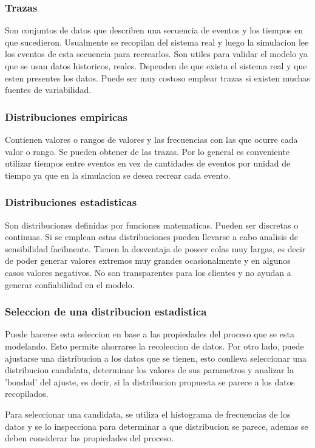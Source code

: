 \documentclass[a4paper]{article}
\begin{document}
\subsubsection*{Trazas}
Son conjuntos de datos que describen una secuencia de eventos y los tiempos en que 
sucedieron. Usualmente se recopilan del sistema real y luego la simulacion lee 
los eventos de esta secuencia para recrearlos. Son utiles para validar el modelo 
ya que se usan datos historicos, reales.
Dependen de que exista el sistema real y que esten presentes los datos. Puede ser muy
costoso emplear trazas si existen muchas fuentes de variabilidad.

\subsubsection*{Distribuciones empiricas}
Contienen valores o rangos de valores y las frecuencias con las que ocurre cada valor o rango.
Se pueden obtener de las trazas.
Por lo general es conveniente utilizar tiempos entre eventos en vez de cantidades de eventos por
unidad de tiempo ya que en la simulacion se desea recrear cada evento.

\subsubsection*{Distribuciones estadisticas}
Son distribuciones definidas por funciones matematicas. Pueden ser discretas o continuas.
Si se emplean estas distribuciones pueden llevarse a cabo analisis de sensibilidad 
facilmente. Tienen la desventaja de poseer colas muy largas, es decir de poder generar
valores extremos muy grandes ocasionalmente y en algunos casos valores negativos.
No son transparentes para los clientes y no ayudan a generar confiabilidad en el modelo.

\subsubsection*{Seleccion de una distribucion estadistica}
Puede hacerse esta seleccion en base a las propiedades del proceso que se esta modelando.
Esto permite ahorrarse la recoleccion de datos.
Por otro lado, puede ajustarse una distribucion a los datos que se tienen, esto conlleva 
seleccionar una distribucion candidata, determinar los valores de sus parametros y analizar
la 'bondad' del ajuste, es decir, si la distribucion propuesta se parece a los datos recopilados.

Para seleccionar una candidata, se utiliza el histograma de frecuencias de los datos y se lo 
inspecciona para determinar a que distribucion se parece, ademas se deben considerar las propiedades 
del proceso.
\end{document}
